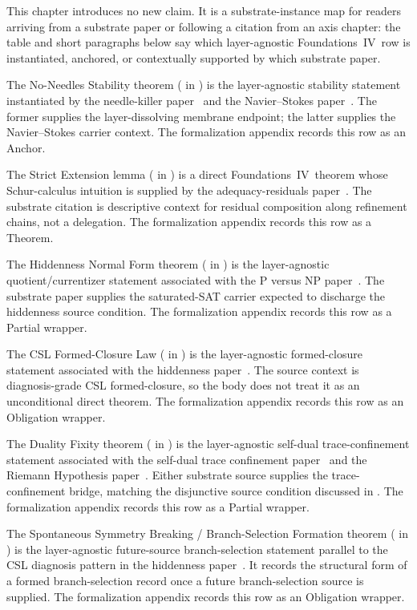 \documentclass[11pt]{article}
\newcommand{\FIV}{Foundations~IV}
\newcommand{\PaperAR}{the adequacy-residuals paper}
\newcommand{\PaperSDTC}{the self-dual trace confinement paper}
\newcommand{\PaperNeedleKiller}{the needle-killer paper}
\newcommand{\PaperNS}{the Navier--Stokes paper}
\newcommand{\PaperRH}{the Riemann Hypothesis paper}
\newcommand{\PaperPvNP}{the P versus NP paper}
\newcommand{\PaperCSL}{the hiddenness paper}
\theoremstyle{definition}
\begin{document}
This chapter introduces no new claim. It is a substrate-instance map
for readers arriving from a substrate paper or following a citation
from an axis chapter: the table and short paragraphs below say which
layer-agnostic \FIV\ row is instantiated, anchored, or contextually
supported by which substrate paper.

The No-Needles Stability theorem ( in
) is the layer-agnostic stability statement
instantiated by \PaperNeedleKiller\ \citep{Tsiokos2026NeedleKiller} and
\PaperNS\ \citep{Tsiokos2026NavierStokes}. The former supplies the
layer-dissolving membrane endpoint; the latter supplies the
Navier--Stokes carrier context. The formalization appendix records this
row as an Anchor.

The Strict Extension lemma ( in ) is a
direct \FIV\ theorem whose Schur-calculus intuition is supplied by
\PaperAR\ \citep{Tsiokos2026XiCompanion}. The substrate citation is
descriptive context for residual composition along refinement chains,
not a delegation. The formalization appendix records this row as a
Theorem.

The Hiddenness Normal Form theorem ( in
) is the layer-agnostic quotient/currentizer statement
associated with \PaperPvNP\ \citep{Tsiokos2026PvNP}. The substrate paper
supplies the saturated-SAT carrier expected to discharge the hiddenness
source condition. The formalization appendix records this row as a
Partial wrapper.

The CSL Formed-Closure Law ( in ) is
the layer-agnostic formed-closure statement associated with \PaperCSL\
\citep{Tsiokos2026CSL}. The source context is diagnosis-grade CSL
formed-closure, so the body does not treat it as an unconditional direct
theorem. The formalization appendix records this row as an Obligation
wrapper.

The Duality Fixity theorem ( in ) is
the layer-agnostic self-dual trace-confinement statement associated with
\PaperSDTC\ \citep{Tsiokos2026SDTC} and \PaperRH\
\citep{Tsiokos2026RH}. Either substrate source supplies the
trace-confinement bridge, matching the disjunctive source condition
discussed in \Cref{thm:F14}. The formalization appendix records this
row as a Partial wrapper.

The Spontaneous Symmetry Breaking / Branch-Selection Formation theorem
( in ) is the layer-agnostic
future-source branch-selection statement parallel to the CSL diagnosis
pattern in \PaperCSL\ \citep{Tsiokos2026CSL}. It records the structural
form of a formed branch-selection record once a future branch-selection
source is supplied. The formalization appendix records this row as an
Obligation wrapper.
\end{document}
